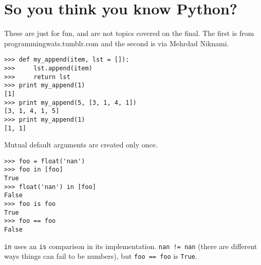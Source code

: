 \documentclass[11pt]{article}
\begin{document}
\section{So you think you know Python?}
\textnormal{These are just for fun, and are not topics covered on the final. The first is from programmingwats.tumblr.com and the second is via Mehrdad Niknami.}

\begin{verbatim}
>>> def my_append(item, lst = []):
>>>     lst.append(item)
>>>     return lst
>>> print my_append(1)
[1]
>>> print my_append(5, [3, 1, 4, 1])
[3, 1, 4, 1, 5]
>>> print my_append(1)
[1, 1]
\end{verbatim}
Mutual default arguments are created only once. 

\begin{verbatim}
>>> foo = float('nan')
>>> foo in [foo]
True
>>> float('nan') in [foo]
False
>>> foo is foo
True
>>> foo == foo
False
\end{verbatim}
\texttt{in} uses an \texttt{is} comparison in its implementation. \texttt{nan != nan} (there are different ways things can fail to be numbers), but \texttt{foo == foo} is \texttt{True}.
\end{document}
